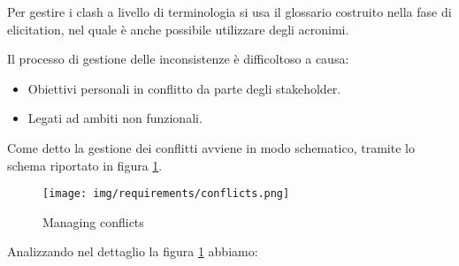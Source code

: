 Per gestire i clash a livello di terminologia si usa il glossario costruito nella fase di elicitation, nel quale è anche possibile utilizzare degli acronimi.

Il processo di gestione delle inconsistenze è difficoltoso a causa:
\begin{itemize}
    \item Obiettivi personali in conflitto da parte degli stakeholder.
    \item Legati ad ambiti non funzionali.
\end{itemize}
Come detto la gestione dei conflitti avviene in modo schematico, tramite lo schema riportato in figura \ref{fig:conflicts}.
\begin{figure}[!ht]
    \centering
    \texttt{[image: img/requirements/conflicts.png]}
    \caption{Managing conflicts}
    \label{fig:conflicts}
\end{figure}
Analizzando nel dettaglio la figura \ref{fig:conflicts} abbiamo:
